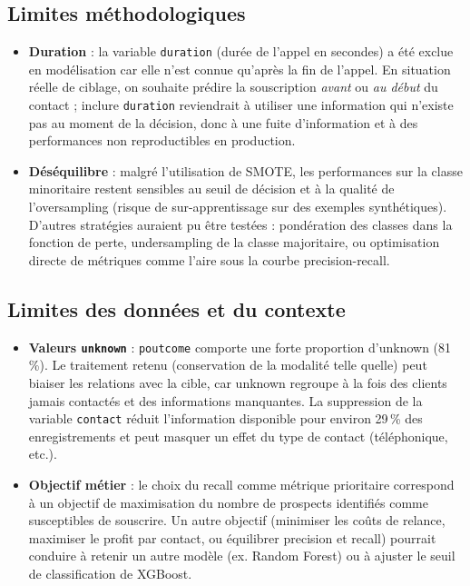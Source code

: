 \documentclass[11pt,a4paper]{article}
\begin{document}
\subsection{Limites méthodologiques}
\begin{itemize}
  \item \textbf{Duration} : la variable \texttt{duration} (durée de l'appel en secondes) a été exclue en modélisation car elle n'est connue qu'après la fin de l'appel. En situation réelle de ciblage, on souhaite prédire la souscription \emph{avant} ou \emph{au début} du contact ; inclure \texttt{duration} reviendrait à utiliser une information qui n'existe pas au moment de la décision, donc à une fuite d'information et à des performances non reproductibles en production.
  \item \textbf{Déséquilibre} : malgré l'utilisation de SMOTE, les performances sur la classe minoritaire restent sensibles au seuil de décision et à la qualité de l'oversampling (risque de sur-apprentissage sur des exemples synthétiques). D'autres stratégies auraient pu être testées : pondération des classes dans la fonction de perte, undersampling de la classe majoritaire, ou optimisation directe de métriques comme l'aire sous la courbe precision-recall.
\end{itemize}

\subsection{Limites des données et du contexte}
\begin{itemize}
  \item \textbf{Valeurs \texttt{unknown}} : \texttt{poutcome} comporte une forte proportion d'unknown (81\,\%). Le traitement retenu (conservation de la modalité telle quelle) peut biaiser les relations avec la cible, car unknown regroupe à la fois des clients jamais contactés et des informations manquantes. La suppression de la variable \texttt{contact} réduit l'information disponible pour environ 29\,\% des enregistrements et peut masquer un effet du type de contact (téléphonique, etc.).
  \item \textbf{Objectif métier} : le choix du recall comme métrique prioritaire correspond à un objectif de maximisation du nombre de prospects identifiés comme susceptibles de souscrire. Un autre objectif (minimiser les coûts de relance, maximiser le profit par contact, ou équilibrer precision et recall) pourrait conduire à retenir un autre modèle (ex. Random Forest) ou à ajuster le seuil de classification de XGBoost.
\end{itemize}
\end{document}
